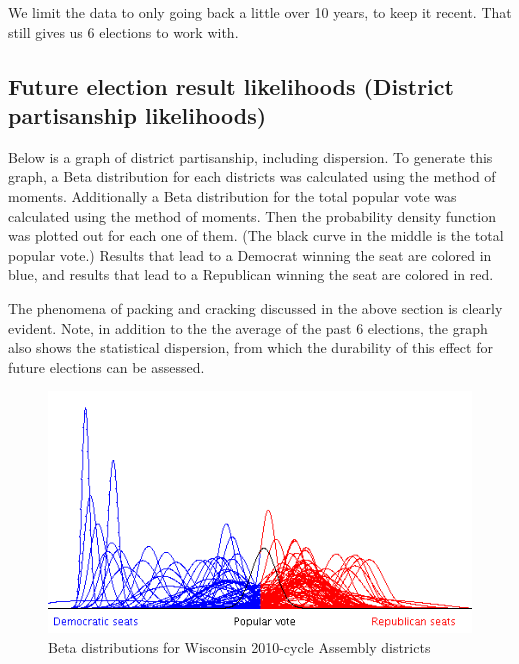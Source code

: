 \documentclass[preprint,12pt]{article}
\begin{document}
We limit the data to only going back a little over 10 years, to keep it recent.  That still gives us 6 elections to work with.
 
\subsection{Future election result likelihoods (District partisanship likelihoods)}
 
Below is a graph of district partisanship, including dispersion.  To generate this graph, a Beta distribution for each districts was calculated using the method of moments.  Additionally a Beta distribution for the total popular vote was calculated using the method of moments.  Then the probability density function was plotted out for each one of them.  (The black curve in the middle is the total popular vote.) Results that lead to a Democrat winning the seat are colored in blue, and results that lead to a Republican winning the seat are colored in red.
 
The phenomena of packing and cracking discussed in the above section is clearly evident.  Note, in addition to the the average of the past 6 elections, the graph also shows the statistical dispersion, from which the durability of this effect for future elections can be assessed.

\begin{figure}[htb!]
    \begin{center}
        \includegraphics[scale=1.0]{../Figures/WI2010/betas.png}
        \caption{Beta distributions for Wisconsin 2010-cycle Assembly districts}\label{fig:Betas}
    \end{center}
\end{figure}
 
\end{document}
